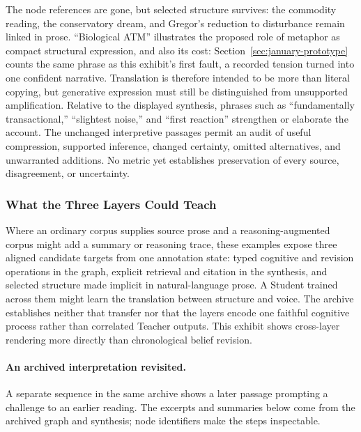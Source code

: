 \documentclass[11pt]{article}
\begin{document}
The node references are gone, but selected structure survives: the commodity
reading, the conservatory dream, and Gregor's reduction to disturbance remain
linked in prose. ``Biological ATM'' illustrates the proposed role of metaphor
as compact structural expression, and also its cost:
Section~\ref{sec:january-prototype} counts the same phrase as this exhibit's
first fault, a recorded tension turned into one confident narrative. Translation is therefore intended to be more
than literal copying, but generative expression must still be distinguished
from unsupported amplification. Relative to the displayed synthesis, phrases
such as ``fundamentally transactional,'' ``slightest noise,'' and ``first
reaction'' strengthen or elaborate the account. The unchanged interpretive passages permit an audit of useful compression, supported
inference, changed certainty, omitted alternatives, and unwarranted additions. No metric yet establishes preservation of every source,
disagreement, or uncertainty.

\subsubsection{What the Three Layers Could Teach}

Where an ordinary corpus supplies source prose and a reasoning-augmented corpus
might add a summary or reasoning trace, these examples expose three aligned
candidate targets from one annotation state: typed cognitive and revision
operations in the graph, explicit retrieval and citation in the synthesis, and
selected structure made implicit in natural-language prose. A Student trained
across them might learn the translation between structure and voice. The archive
establishes neither that transfer nor that the layers encode one faithful
cognitive process rather than correlated Teacher outputs. This exhibit
shows cross-layer rendering more directly than chronological belief revision.

\paragraph{An archived interpretation revisited.} A separate sequence in the
same archive shows a later passage prompting a challenge to an earlier reading.
The excerpts and summaries below come from the archived graph and synthesis;
node identifiers make the steps inspectable.
\end{document}
